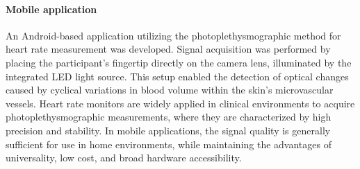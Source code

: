 \documentclass{citask}
\begin{document}
\paragraph{Mobile application}
An Android-based application utilizing the photoplethysmographic method for heart rate measurement was developed. Signal acquisition was performed by placing the participant’s fingertip directly on the camera lens, illuminated by the integrated LED light source. This setup enabled the detection of optical changes caused by cyclical variations in blood volume within the skin’s microvascular vessels.
Heart rate monitors are widely applied in clinical environments to acquire photoplethysmographic measurements, where they are characterized by high precision and stability. In mobile applications, the signal quality is generally sufficient for use in home environments, while maintaining the advantages of universality, low cost, and broad hardware accessibility.
\end{document}
